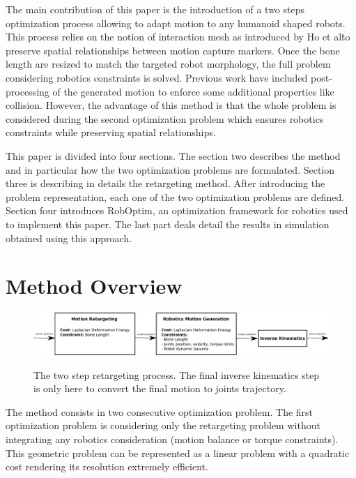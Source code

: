 \documentclass[letterpaper, 10 pt, conference]{ieeeconf}  %
\begin{document}
The main contribution of this paper is the introduction of a two steps
optimization process allowing to adapt motion to any humanoid shaped
robots. This process relies on the notion of interaction mesh as
introduced by Ho et al\. to preserve spatial relationships between
motion capture markers. Once the bone length are resized to match the
targeted robot morphology, the full problem considering robotics
constraints is solved. Previous work have included post-processing of
the generated motion to enforce some additional properties like
collision. However, the advantage of this method is that the whole
problem is considered during the second optimization problem which
ensures robotics constraints while preserving spatial relationships.


This paper is divided into four sections. The section two describes
the method and in particular how the two optimization problems are
formulated. Section three is describing in details the retargeting
method. After introducing the problem representation, each one of the
two optimization problems are defined. Section four introduces
RobOptim, an optimization framework for robotics used to implement
this paper. The last part deals detail the results in simulation
obtained using this approach.


\section{Method Overview}
\label{sec:overview}

\begin{figure}[htbp!]
  \includegraphics[width=\linewidth]{figure/architecture.pdf}
  \label{fig:algorithm}
  \caption{The two step retargeting process. The final inverse
    kinematics step is only here to convert the final motion to joints
    trajectory.}
\end{figure}


The method consists in two consecutive optimization problem. The first
optimization problem is considering only the retargeting problem
without integrating any robotics consideration (motion balance or
torque constraints). This geometric problem can be represented as a
linear problem with a quadratic cost rendering its resolution
extremely efficient.
\end{document}

